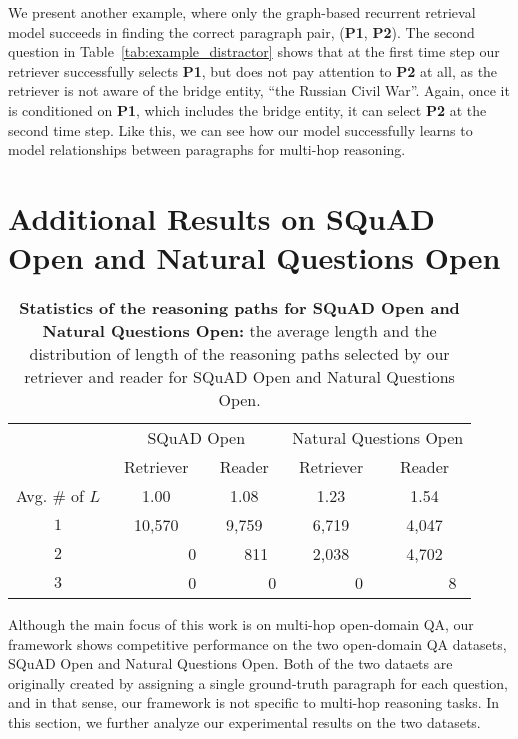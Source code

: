 We present another example, where only the graph-based recurrent retrieval model succeeds in finding the correct paragraph pair, ({\bf P1}, {\bf P2}).
The second question in Table~\ref{tab:example_distractor} shows that at the first time step our retriever successfully selects {\bf P1}, but does not pay attention to {\bf P2} at all, as the retriever is not aware of the bridge entity, ``the Russian Civil War''.
Again, once it is conditioned on {\bf P1}, which includes the bridge entity, it can select {\bf P2} at the second time step. 
Like this, we can see how our model successfully learns to model relationships between paragraphs for multi-hop reasoning.

\section{Additional Results on SQuAD Open and Natural Questions Open}
\label{sec:squad_nq_additional_result}

\begin{table}[t]

\begin{center}
\begin{tabular}{c| c |c || c | c}\toprule
 & \multicolumn{2}{c}{SQuAD Open} & \multicolumn{2}{c}{Natural Questions Open} \\
 & Retriever & Reader & Retriever & Reader \\
Avg. \# of $L$ & 1.00 & 1.08  & 1.23 & 1.54 \\
\midrule
$1$ &     10,570 &    9,759 &    6,719 &    4,047 \\
$2$ & ~~~~~~~~~0 &   ~~~811 &    2,038 &    4,702 \\
$3$ & ~~~~~~~~~0 & ~~~~~~~0 & ~~~~~~~0 & ~~~~~~~8 \\
\bottomrule
\end{tabular}
\caption{{\bf Statistics of the reasoning paths for SQuAD Open and Natural Questions Open:} the average length and the distribution of length of the reasoning paths selected by our retriever and reader for SQuAD Open and Natural Questions Open.
}\label{tab:comparison_num_retrieval_squad_nq}
\end{center}

\end{table}

Although the main focus of this work is on multi-hop open-domain QA, our framework shows competitive performance on the two open-domain QA datasets, SQuAD Open and Natural Questions Open.
Both of the two dataets are originally created by assigning a single ground-truth paragraph for each question, and in that sense, our framework is not specific to multi-hop reasoning tasks.
In this section, we further analyze our experimental results on the two datasets.

